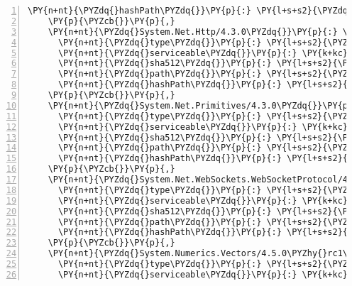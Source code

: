 \begin{Verbatim}[commandchars=\\\{\},numbers=left,firstnumber=1,stepnumber=1,numberblanklines=0]
      \PY{n+nt}{\PYZdq{}hashPath\PYZdq{}}\PY{p}{:} \PY{l+s+s2}{\PYZdq{}system.memory.4.5.0\PYZhy{}rc1.nupkg.sha512\PYZdq{}}
    \PY{p}{\PYZcb{}}\PY{p}{,}
    \PY{n+nt}{\PYZdq{}System.Net.Http/4.3.0\PYZdq{}}\PY{p}{:} \PY{p}{\PYZob{}}
      \PY{n+nt}{\PYZdq{}type\PYZdq{}}\PY{p}{:} \PY{l+s+s2}{\PYZdq{}package\PYZdq{}}\PY{p}{,}
      \PY{n+nt}{\PYZdq{}serviceable\PYZdq{}}\PY{p}{:} \PY{k+kc}{true}\PY{p}{,}
      \PY{n+nt}{\PYZdq{}sha512\PYZdq{}}\PY{p}{:} \PY{l+s+s2}{\PYZdq{}sha512\PYZhy{}sYg+FtILtRQuYWSIAuNOELwVuVsxVyJGWQyOnlAzhV4xvhyFnON1bAzYYC+jjRW8JREM45R0R5Dgi8MTC5sEwA==\PYZdq{}}\PY{p}{,}
      \PY{n+nt}{\PYZdq{}path\PYZdq{}}\PY{p}{:} \PY{l+s+s2}{\PYZdq{}system.net.http/4.3.0\PYZdq{}}\PY{p}{,}
      \PY{n+nt}{\PYZdq{}hashPath\PYZdq{}}\PY{p}{:} \PY{l+s+s2}{\PYZdq{}system.net.http.4.3.0.nupkg.sha512\PYZdq{}}
    \PY{p}{\PYZcb{}}\PY{p}{,}
    \PY{n+nt}{\PYZdq{}System.Net.Primitives/4.3.0\PYZdq{}}\PY{p}{:} \PY{p}{\PYZob{}}
      \PY{n+nt}{\PYZdq{}type\PYZdq{}}\PY{p}{:} \PY{l+s+s2}{\PYZdq{}package\PYZdq{}}\PY{p}{,}
      \PY{n+nt}{\PYZdq{}serviceable\PYZdq{}}\PY{p}{:} \PY{k+kc}{true}\PY{p}{,}
      \PY{n+nt}{\PYZdq{}sha512\PYZdq{}}\PY{p}{:} \PY{l+s+s2}{\PYZdq{}sha512\PYZhy{}qOu+hDwFwoZPbzPvwut2qATe3ygjeQBDQj91xlsaqGFQUI5i4ZnZb8yyQuLGpDGivEPIt8EJkd1BVzVoP31FXA==\PYZdq{}}\PY{p}{,}
      \PY{n+nt}{\PYZdq{}path\PYZdq{}}\PY{p}{:} \PY{l+s+s2}{\PYZdq{}system.net.primitives/4.3.0\PYZdq{}}\PY{p}{,}
      \PY{n+nt}{\PYZdq{}hashPath\PYZdq{}}\PY{p}{:} \PY{l+s+s2}{\PYZdq{}system.net.primitives.4.3.0.nupkg.sha512\PYZdq{}}
    \PY{p}{\PYZcb{}}\PY{p}{,}
    \PY{n+nt}{\PYZdq{}System.Net.WebSockets.WebSocketProtocol/4.5.0\PYZhy{}rc1\PYZdq{}}\PY{p}{:} \PY{p}{\PYZob{}}
      \PY{n+nt}{\PYZdq{}type\PYZdq{}}\PY{p}{:} \PY{l+s+s2}{\PYZdq{}package\PYZdq{}}\PY{p}{,}
      \PY{n+nt}{\PYZdq{}serviceable\PYZdq{}}\PY{p}{:} \PY{k+kc}{true}\PY{p}{,}
      \PY{n+nt}{\PYZdq{}sha512\PYZdq{}}\PY{p}{:} \PY{l+s+s2}{\PYZdq{}sha512\PYZhy{}tmKt6gBbkqpH6zn8z7UdB+GKZAyULSzMEjJZTFBEIqak4weEQJchXEM09FmEokcRGe2Pcvwe4SrEKtmpMUtaOA==\PYZdq{}}\PY{p}{,}
      \PY{n+nt}{\PYZdq{}path\PYZdq{}}\PY{p}{:} \PY{l+s+s2}{\PYZdq{}system.net.websockets.websocketprotocol/4.5.0\PYZhy{}rc1\PYZdq{}}\PY{p}{,}
      \PY{n+nt}{\PYZdq{}hashPath\PYZdq{}}\PY{p}{:} \PY{l+s+s2}{\PYZdq{}system.net.websockets.websocketprotocol.4.5.0\PYZhy{}rc1.nupkg.sha512\PYZdq{}}
    \PY{p}{\PYZcb{}}\PY{p}{,}
    \PY{n+nt}{\PYZdq{}System.Numerics.Vectors/4.5.0\PYZhy{}rc1\PYZdq{}}\PY{p}{:} \PY{p}{\PYZob{}}
      \PY{n+nt}{\PYZdq{}type\PYZdq{}}\PY{p}{:} \PY{l+s+s2}{\PYZdq{}package\PYZdq{}}\PY{p}{,}
      \PY{n+nt}{\PYZdq{}serviceable\PYZdq{}}\PY{p}{:} \PY{k+kc}{true}\PY{p}{,}

\end{Verbatim}
